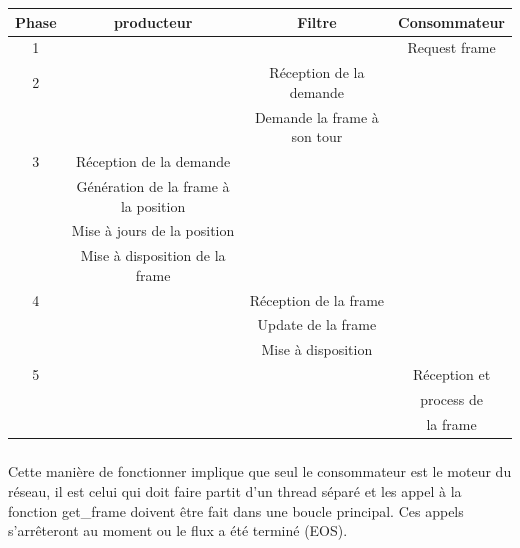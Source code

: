 \begin{center}

  \begin{tabular}{ | c | c | c | c |}

    \hline

      Phase & producteur              & Filtre                      &
      Consommateur    \\ \hline \hline

      1     &                         &                             &
      Request frame   \\ \hline 2     &                         &
      Réception de la demande     &                 \\
            &                         & Demande la frame à son tour&
            \\ \hline
      3     & Réception de la demande &                             & \\
            & Génération de la frame à la position &                &
            \\ & Mise à jours de la position          &                &
            \\ & Mise à disposition de la frame       &                &
            \\ \hline
      4     &                         & Réception de la frame       & \\
            &                         & Update de la frame          &
            \\ & & Mise à disposition          & \\ \hline
      5     &                         &                             &
      Réception et    \\
            &                         &                             &
            process de      \\ &                         & & la
            frame        \\

    \hline

  \end{tabular}

\end{center}

\subparagraph{}

Cette manière de fonctionner implique que seul le consommateur est
le moteur du réseau, il est celui qui doit faire partit d'un thread
séparé et les appel à la fonction get\_frame doivent être fait dans
une boucle principal.  Ces appels s'arrêteront au moment ou le flux a
été terminé (EOS).


